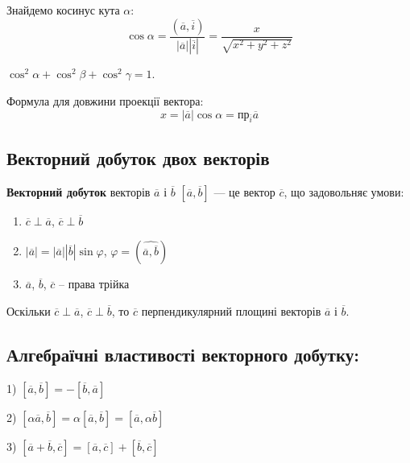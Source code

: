 Знайдемо косинус кута $\alpha$: 
$$\cos\alpha = \dfrac{(\overline{a}, \overline{i})}{|\overline{a}||\overline{i}|} = \dfrac{x}{\sqrt{x^2+y^2+z^2}}$$

\begin{claim}
	$\cos^2\alpha + \cos^2\beta + \cos^2\gamma = 1$.
\end{claim}

Формула для довжини проекції вектора:
$$x = |\overline{a}|\cos\alpha = \text{пр}_{\overline{i}}\overline{a}$$

\subsection{Векторний добуток двох векторів}

\begin{definition}
	\textbf{Векторний добуток} векторів $\overline{a}$ і $\overline{b}$ $[\overline{a}, \overline{b}]$
	--- це вектор $\overline{c}$, що задовольняє умови:
	\begin{enumerate}
		\item $\overline{c}\perp\overline{a}$, $\overline{c}\perp\overline{b}$
		\item $|\overline{a}| = |\overline{a}||\overline{b}|\sin\varphi$, $\varphi = (\widehat{\overline{a},
			\overline{b}})$
		\item $\overline{a}$, $\overline{b}$, $\overline{c}$ -- права трійка
	\end{enumerate}
\end{definition}

\begin{remark}
	Оскільки $\overline{c}\perp\overline{a}$, $\overline{c}\perp\overline{b}$, то $\overline{c}$
	перпендикулярний площині векторів $\overline{a}$ і $\overline{b}$. 
\end{remark}

\subsection*{Алгебраїчні властивості векторного добутку:}

1) $[\overline{a}, \overline{b}] = - [\overline{b}, \overline{a}]$
	
2) $[\alpha\overline{a}, \overline{b}] = \alpha[\overline{a}, \overline{b}] = [\overline{a}, \alpha\overline{b}]$

3) $[\overline{a} + \overline{b}, \overline{c}] = [\overline{a}, \overline{c}] + [\overline{b}, \overline{c}]$
	

